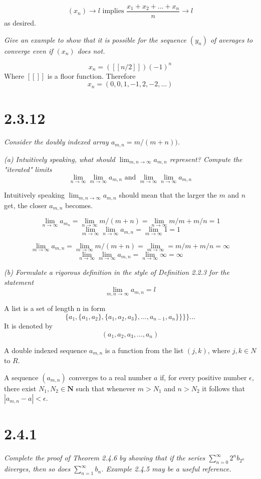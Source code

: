 \documentclass[11pt,oneside,titlepage]{book}
\begin{document}
$$(x_n) \to l \text{ implies } \frac{x_1 + x_2 + ... + x_n}{n} \to l$$
as desired.

\textit{Give an example to show that it is possible for the sequence $(y_n)$
  of averages to converge even if $(x_n)$ does not.}

$$x_n = ([[n / 2]])(-1)^n$$
Where $[[]]$ is a floor function.
Therefore
$$x_n = (0, 0, 1, -1, 2, -2, ...)$$


\section*{2.3.12}
\textit{Consider the doubly indexed array $a_{m,n} = m / (m + n))$.}

\textit{(a) Intuitively speaking, what should $\lim_{m,n \to \infty} a_{m,n}$
  represent? Compute the "iterated" limits}
$$ \lim_{n \to \infty} \lim_{m \to \infty} a_{m,n} \text{ and }
\lim_{m \to \infty} \lim_{n \to \infty} a_{m,n} $$

Intuitively speaking $\lim_{m,n \to \infty} a_{m,n}$ should mean that
the larger the $m$ and $n$ get, the closer $a_{m,n}$ becomes.

$$\lim_{n \to \infty} a_{m_n} = \lim_{n \to \infty} m/(m + n) =
\lim_{n \to \infty} m/m + m/n = 1$$  
$$\lim_{m \to \infty} \lim_{n \to \infty} a_{m,n} =
\lim_{m \to \infty}  1 = 1$$

$$\lim_{m \to \infty} a_{m,n} = \lim_{m \to \infty} m/(m + n) =
\lim_{m \to \infty} = m/m + m/n = \infty$$
$$\lim_{n \to \infty} \lim_{m \to \infty} a_{m,n} = \lim_{n \to \infty} \infty = \infty$$

\textit{(b) Formulate a rigorous definition in the style of Definition 2.2.3
  for the statement}
$$\lim_{m,n \to \infty} a_{m,n} = l$$

A list is a set of length n in form
$$\{a_1, \{a_1, a_2\}, \{a_1, a_2, a_3\}, ..., a_{n -1}, a_n\}\}\}\}... $$
It is denoted by
$$(a_1, a_2, a_3, ..., a_n)$$

A double indexed sequence $a_{m,n}$ is a function from the list $(j, k)$,
where $j, k \in N$ to $R$.

A sequence $(a_{m, n})$ converges to a real number $a$ if, for every positive
number $\epsilon$, there exist $N_1, N_2 \in \textbf{N}$ such that
whenever $m > N_1$ and $n > N_2$ it follows that $|a_{m,n} - a| <
\epsilon$.

\section*{2.4.1}
\textit{Complete the proof of Theorem 2.4.6 by showing that if the
  series $\sum^{\infty}_{n = 0} 2^n b_{2^n}$ diverges, then so does
  $\sum^{\infty}_{n = 1} b_n$. Example 2.4.5 may be a useful reference.}
\end{document}
